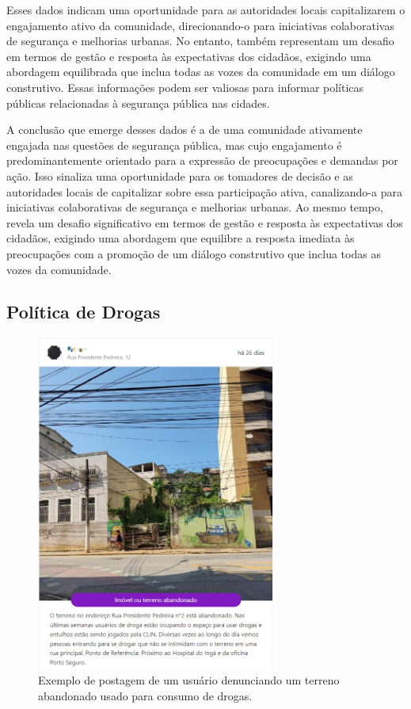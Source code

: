Esses dados indicam uma oportunidade para as autoridades locais capitalizarem o engajamento ativo da comunidade, direcionando-o para iniciativas colaborativas de segurança e melhorias urbanas. No entanto, também representam um desafio em termos de gestão e resposta às expectativas dos cidadãos, exigindo uma abordagem equilibrada que inclua todas as vozes da comunidade em um diálogo construtivo. Essas informações podem ser valiosas para informar políticas públicas relacionadas à segurança pública nas cidades.

A conclusão que emerge desses dados é a de uma comunidade ativamente engajada nas questões de segurança pública, mas cujo engajamento é predominantemente orientado para a expressão de preocupações e demandas por ação. Isso sinaliza uma oportunidade para os tomadores de decisão e as autoridades locais de capitalizar sobre essa participação ativa, canalizando-a para iniciativas colaborativas de segurança e melhorias urbanas. Ao mesmo tempo, revela um desafio significativo em termos de gestão e resposta às expectativas dos cidadãos, exigindo uma abordagem que equilibre a resposta imediata às preocupações com a promoção de um diálogo construtivo que inclua todas as vozes da comunidade.

\subsection{Política de Drogas}
\label{sec:eventos_populares_drugs}

\begin{figure}[htb]
	\centering
	\includegraphics[width=0.7\textwidth]{images/colab_posts_drugs.png}
	\caption{Exemplo de postagem de um usuário denunciando um terreno abandonado usado para consumo de drogas.}
	\label{fig:colab_posts_drugs}
\end{figure}

